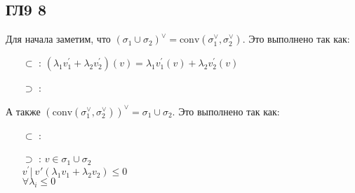 \subsection*{ГЛ9 8}
Для начала заметим, что $(\sigma_1 \cup \sigma_2)^{\vee} = \text{conv}(\sigma_1^{\vee}, \sigma_2^{\vee})$. Это выполнено так как:
\begin{enumerate}
\item[$\subset$]:
	$(\lambda_1 v_1^{\prime} + \lambda_2 v_2^{\prime})(v) = \lambda_1 v_1^{\prime}(v) + \lambda_2 v_2^{\prime}(v)$ 
\item[$\supset$]:
\end{enumerate}
А также $(\text{conv}(\sigma_1^{\vee}, \sigma_2^{\vee}))^{\vee} = \sigma_1 \cup \sigma_2$. Это выполнено так как:
\begin{enumerate}
\item[$\subset$]: 
\item[$\supset$]:
	$v \in \sigma_1 \cup \sigma_2$\\
	$v^{\prime}|\ v^{}\prime(\lambda_1v_1 + \lambda_2v_2) \leqslant 0$\\
	$\forall \lambda_i \leqslant 0	$
\end{enumerate}
		